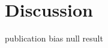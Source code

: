 
\chapter{Discussion}
\label{ch:discussion}

\linespread{1.5}
\newpage


publication bias 
null result